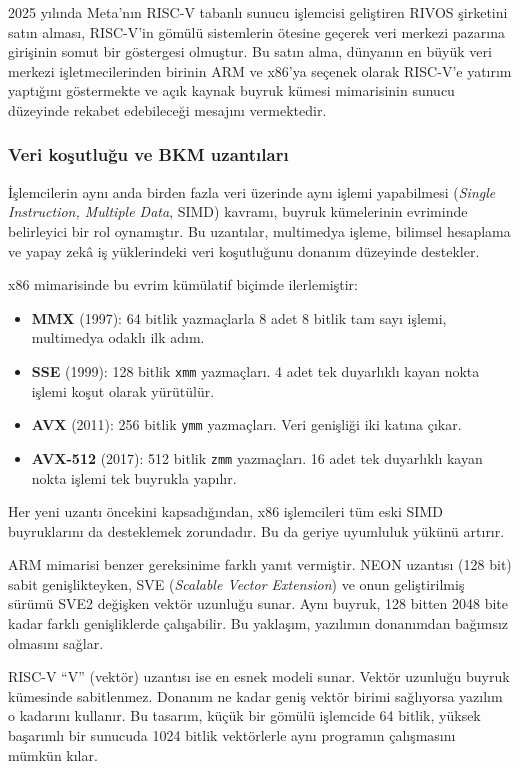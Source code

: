2025 yılında Meta'nın RISC-V tabanlı sunucu işlemcisi geliştiren RIVOS şirketini satın alması, RISC-V'in gömülü sistemlerin ötesine geçerek veri merkezi pazarına girişinin somut bir göstergesi olmuştur. Bu satın alma, dünyanın en büyük veri merkezi işletmecilerinden birinin ARM ve x86'ya seçenek olarak RISC-V'e yatırım yaptığını göstermekte ve açık kaynak buyruk kümesi mimarisinin sunucu düzeyinde rekabet edebileceği mesajını vermektedir.

\subsubsection*{Veri koşutluğu ve BKM uzantıları}
İşlemcilerin aynı anda birden fazla veri üzerinde aynı işlemi yapabilmesi (\emph{Single Instruction, Multiple Data}, SIMD) kavramı, buyruk kümelerinin evriminde belirleyici bir rol oynamıştır. Bu uzantılar, multimedya işleme, bilimsel hesaplama ve yapay zekâ iş yüklerindeki veri koşutluğunu donanım düzeyinde destekler.

x86 mimarisinde bu evrim kümülatif biçimde ilerlemiştir:
\begin{itemize}[nosep]
\item \textbf{MMX} (1997): 64 bitlik yazmaçlarla 8 adet 8 bitlik tam sayı işlemi, multimedya odaklı ilk adım.
\item \textbf{SSE} (1999): 128 bitlik \texttt{xmm} yazmaçları. 4 adet tek duyarlıklı kayan nokta işlemi koşut olarak yürütülür.
\item \textbf{AVX} (2011): 256 bitlik \texttt{ymm} yazmaçları. Veri genişliği iki katına çıkar.
\item \textbf{AVX-512} (2017): 512 bitlik \texttt{zmm} yazmaçları. 16 adet tek duyarlıklı kayan nokta işlemi tek buyrukla yapılır.
\end{itemize}

Her yeni uzantı öncekini kapsadığından, x86 işlemcileri tüm eski SIMD buyruklarını da desteklemek zorundadır. Bu da geriye uyumluluk yükünü artırır.

ARM mimarisi benzer gereksinime farklı yanıt vermiştir. NEON uzantısı (128 bit) sabit genişlikteyken, SVE (\emph{Scalable Vector Extension}) ve onun geliştirilmiş sürümü SVE2 değişken vektör uzunluğu sunar. Aynı buyruk, 128 bitten 2048 bite kadar farklı genişliklerde çalışabilir. Bu yaklaşım, yazılımın donanımdan bağımsız olmasını sağlar.

RISC-V ``V'' (vektör) uzantısı ise en esnek modeli sunar. Vektör uzunluğu buyruk kümesinde sabitlenmez. Donanım ne kadar geniş vektör birimi sağlıyorsa yazılım o kadarını kullanır. Bu tasarım, küçük bir gömülü işlemcide 64 bitlik, yüksek başarımlı bir sunucuda 1024 bitlik vektörlerle aynı programın çalışmasını mümkün kılar.

